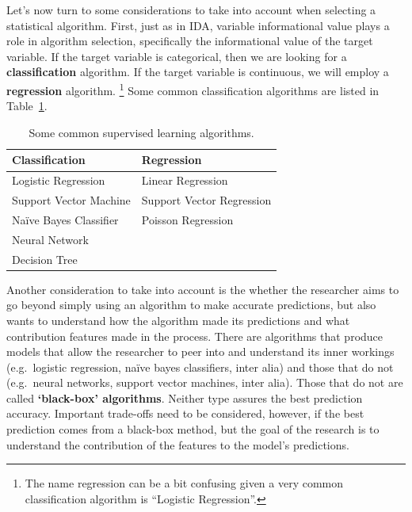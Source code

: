\documentclass[
  letterpaper,
]{scrbook}
\begin{document}
Let's now turn to some considerations to take into account when
selecting a statistical algorithm. First, just as in IDA, variable
informational value plays a role in algorithm selection, specifically
the informational value of the target variable. If the target variable
is categorical, then we are looking for a \textbf{classification}
algorithm. If the target variable is continuous, we will employ a
\textbf{regression} algorithm. \footnote{The name regression can be a
  bit confusing given a very common classification algorithm is
  ``Logistic Regression''.} Some common classification algorithms are
listed in Table~\ref{tbl-pda-algorithms}.

\hypertarget{tbl-pda-algorithms}{}
\begin{table}
\caption{\label{tbl-pda-algorithms}Some common supervised learning algorithms. }\tabularnewline

\centering
\begin{tabular}{ll}
\toprule
Classification & Regression\\
\midrule
Logistic Regression & Linear Regression\\
Support Vector Machine & Support Vector Regression\\
Naïve Bayes Classifier & Poisson Regression\\
Neural Network & \\
Decision Tree & \\
\bottomrule
\end{tabular}
\end{table}

\begin{table}

\end{table}

\begin{table}

\end{table}

Another consideration to take into account is the whether the researcher
aims to go beyond simply using an algorithm to make accurate
predictions, but also wants to understand how the algorithm made its
predictions and what contribution features made in the process. There
are algorithms that produce models that allow the researcher to peer
into and understand its inner workings (e.g.~logistic regression, naïve
bayes classifiers, inter alia) and those that do not (e.g.~neural
networks, support vector machines, inter alia). Those that do not are
called \textbf{`black-box' algorithms}. Neither type assures the best
prediction accuracy. Important trade-offs need to be considered,
however, if the best prediction comes from a black-box method, but the
goal of the research is to understand the contribution of the features
to the model's predictions.
\end{document}

